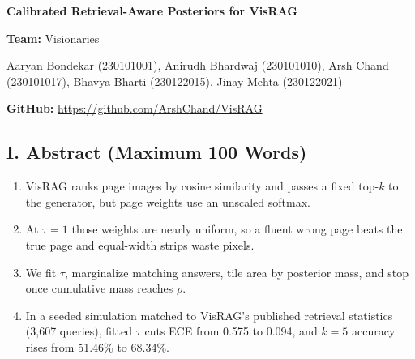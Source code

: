 \documentclass[8pt,a4paper]{article}
\begin{document}
\thispagestyle{empty}

\begin{center}
\setlength{\baselineskip}{10pt}
{\large\bfseries Calibrated Retrieval-Aware Posteriors for VisRAG\par}
\vspace{2pt}
\textbf{Team:} Visionaries\par
Aaryan Bondekar (230101001),
Anirudh Bhardwaj (230101010),
Arsh Chand (230101017),
Bhavya Bharti (230122015),
Jinay Mehta (230122021)\par
\textbf{GitHub:} \url{https://github.com/ArshChand/VisRAG}\par
\end{center}

\vspace{-6pt}

\subsection*{I. Abstract (Maximum 100 Words)}
\begin{enumerate}
    \item VisRAG ranks page images by cosine similarity and passes a fixed top-$k$ to the generator, but page weights use an unscaled softmax.
    \item At $\tau{=}1$ those weights are nearly uniform, so a fluent wrong page beats the true page and equal-width strips waste pixels.
    \item We fit $\tau$, marginalize matching answers, tile area by posterior mass, and stop once cumulative mass reaches $\rho$.
    \item In a seeded simulation matched to VisRAG's published retrieval statistics (3{,}607 queries), fitted $\tau$ cuts ECE from 0.575 to 0.094, and $k{=}5$ accuracy rises from 51.46\% to 68.34\%.
\end{enumerate}

\end{document}
